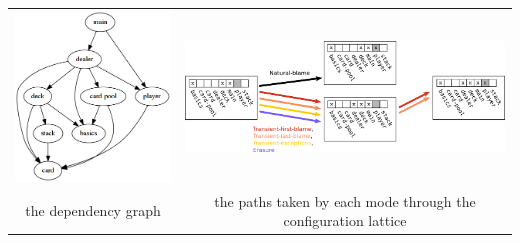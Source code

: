 {\begin{tabular}{l|ccl|ccl|cc|c}
\multicolumn{3}{c}{\begin{minipage}{0.25\textwidth}\centering\includegraphics[width=\linewidth]{Images/take5-module-graph}\end{minipage}} &
\multicolumn{7}{c}{\begin{minipage}{0.69\textwidth}\centering\includegraphics[width=\linewidth]{Images/trails-example}\end{minipage}} \\
\multicolumn{3}{c}{\begin{minipage}{0.25\textwidth}\centering the dependency graph\end{minipage}} &
\multicolumn{7}{c}{\begin{minipage}{0.69\textwidth}\centering the paths taken by each mode through the configuration lattice\end{minipage}} 
\vspace{1em} \\
\end{tabular}

}
